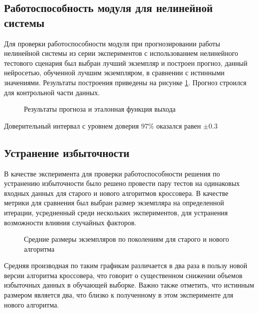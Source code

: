 \documentclass[utf8,usehyperref,14pt]{G7-32}
\begin{document}
\subsection{Работоспособность модуля для нелинейной системы}
Для проверки работоспособности модуля при прогнозировании работы нелинейной системы из серии экспериментов с использованием нелинейного тестового сценария был выбран лучший экземпляр и построен прогноз, данный нейросетью, обученной лучшим экземпляром, в сравнении с истинными значениями. Результаты построения приведены на рисунке \ref{nonlinear_work}. Прогноз строился для контрольной части данных.
\begin{figure}[H]
 
  \caption{Результаты прогноза и эталонная функция выхода}\label{nonlinear_work}
\end{figure}
Доверительный интервал с уровнем доверия 97\% оказался равен $ \pm 0.3 $
\subsection{Устранение избыточности}
В качестве эксперимента для проверки работоспособности решения по устранению избыточности было решено провести пару тестов на одинаковых входных данных для старого и нового алгоритмов кроссовера. В качестве метрики для сравнения был выбран размер экземпляра на определенной итерации, усредненный среди нескольких экспериментов, для устранения возможности влияния случайных факторов.
\begin{figure}[H]

   \caption{Средние размеры экземпляров по поколениям для старого и нового алгоритма}\label{cross_diff}
\end{figure}
Средняя производная по таким графикам различается в два раза в пользу новой версии алгоритма кроссовера, что говорит о существенном снижении объемов избыточных данных в обучающей выборке. Важно также отметить, что истинным размером является два, что близко к полученному в этом эксперименте для нового алгоритма. 
\end{document}
